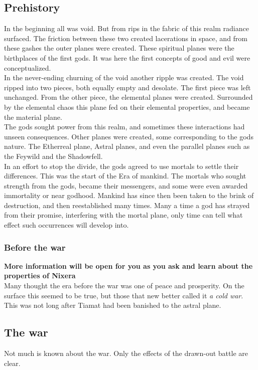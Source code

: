 \documentclass[a4paper]{article}
\begin{document}
\subsection{Prehistory}
In the beginning all was void. But from rips in the fabric of this realm radiance surfaced. The friction between these two created lacerations in space, and from these gashes the outer planes were created. These spiritual planes were the birthplaces of the first gods. It was here the first concepts of good and evil were conceptualized.\\
In the never-ending churning of the void another ripple was created. The void ripped into two pieces, both equally empty and desolate. The first piece was left unchanged. From the other piece, the elemental planes were created. Surrounded by the elemental chaos this plane fed on their elemental properties, and became the material plane.\\
The gods sought power from this realm, and sometimes these interactions had unseen consequences. Other planes were created, some corresponding to the gods nature. The Etherreal plane, Astral planes, and even the parallel planes such as the Feywild and the Shadowfell.\\
In an effort to stop the divide, the gods agreed to use mortals to settle their differences. This was the start of the Era of mankind. The mortals who sought strength from the gods, became their messengers, and some were even awarded immortality or near godhood. Mankind has since then been taken to the brink of destruction, and then reestablished many times. Many a time a god has strayed from their promise, interfering with the mortal plane, only time can tell what effect such occurrences will develop into.

\subsubsection{Before the war}
\textbf{More information will be open for you as you ask and learn about the properties of Nixera}
\\
Many thought the era before the war was one of peace and prosperity. On the surface this seemed to be true, but those that new better called it \textit{a cold war}. This was not long after Tiamat had been banished to the astral plane.
\subsection{The war}
Not much is known about the war. Only the effects of the drawn-out battle are clear.  
\end{document}
